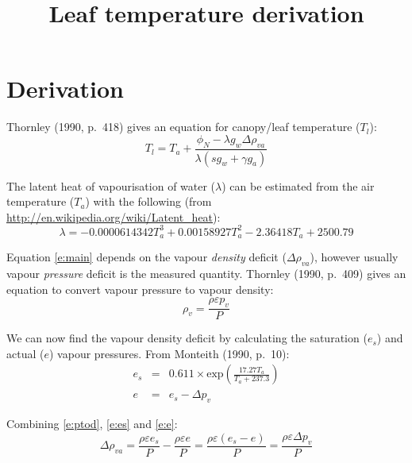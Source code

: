 \documentclass[a4paper]{article}
\title{Leaf temperature derivation}
\date{}
\begin{document}



\section{Derivation}

Thornley (1990, p.~418) gives an equation for canopy/leaf temperature ($T_l$):
\begin{equation}
\label{e:main}
T_l =  T_a + \frac{\phi_N - \lambda g_w \Delta \rho_{va}}{\lambda \left(s g_w + \gamma g_a\right)}
\end{equation}

The latent heat of vapourisation of water ($\lambda$) can be estimated from the air temperature 
($T_a$) with the following (from \url{http://en.wikipedia.org/wiki/Latent_heat}):
\begin{equation}
\lambda = -0.0000614342 T_a^3 + 0.00158927 T_a^2 - 2.36418 T_a + 2500.79
\end{equation}

Equation \eqref{e:main} depends on the vapour \emph{density} deficit ($\Delta \rho_{va}$), however 
usually vapour \emph{pressure} deficit is the measured quantity.  Thornley (1990, p.~409) gives an 
equation to convert vapour pressure to vapour density:
\begin{equation}
\label{e:ptod}
\rho_v = \frac{\rho \varepsilon p_v}{P}
\end{equation}

We can now find the vapour density deficit by calculating the saturation ($e_s$) and actual ($e$) 
    vapour pressures.  From Monteith (1990, p.~10):
\begin{eqnarray}
\label{e:es}
e_s & = & 0.611 \times \text{exp}\left(\frac{17.27 T_a}{T_a + 237.3}\right) \\
e & = & e_s - \Delta p_v
\end{eqnarray}

Combining \eqref{e:ptod}, \eqref{e:es} and \eqref{e:e}:
\begin{equation}
\label{e:e}
\Delta \rho_{va} = \frac{\rho \varepsilon e_s}{P} - \frac{\rho \varepsilon e}{P} = \frac{\rho 
    \varepsilon (e_s - e)}{P} = \frac{\rho \varepsilon \Delta p_v}{P}
\end{equation}
\end{document}
